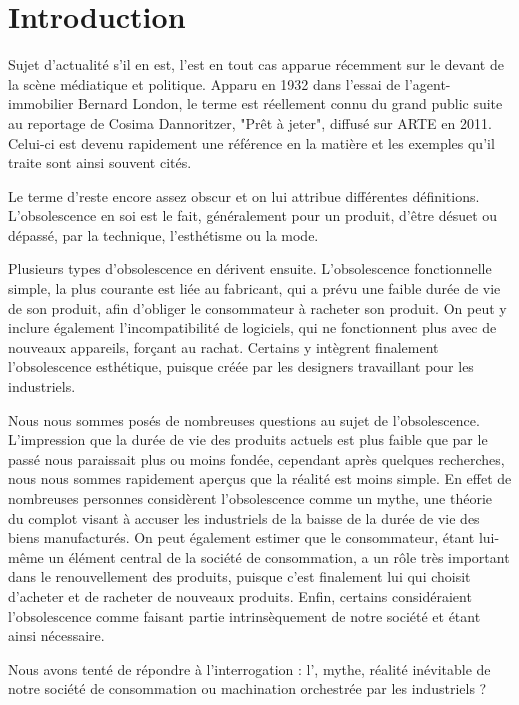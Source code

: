 \chapter*{Introduction}



Sujet d'actualité s'il en est, l'\op est en tout cas apparue récemment sur le devant de la scène médiatique et politique. Apparu en 1932 dans l'essai de l'agent-immobilier Bernard London, le terme est réellement connu du grand public suite au reportage de Cosima Dannoritzer, "Prêt à jeter", diffusé sur ARTE en 2011. Celui-ci est devenu rapidement une référence en la matière et les exemples qu'il traite sont ainsi souvent cités.

\smallbreak Le terme d'\op reste encore assez obscur et on lui attribue différentes définitions. L'obsolescence en soi est le fait, généralement pour un produit, d'être désuet ou dépassé, par la technique, l'esthétisme ou la mode.

\smallbreak Plusieurs types d'obsolescence en dérivent ensuite. L’obsolescence fonctionnelle simple, la plus courante est liée au fabricant, qui a prévu une faible durée de vie de son produit, afin d'obliger le consommateur à racheter son produit. On peut y inclure également l'incompatibilité de logiciels, qui ne fonctionnent plus avec de nouveaux appareils, forçant au rachat. Certains y intègrent finalement l'obsolescence esthétique, puisque créée par les designers travaillant pour les industriels.

\smallbreak Nous nous sommes posés de nombreuses questions au sujet de l'obsolescence. L'impression que la durée de vie des produits actuels est plus faible que par le passé nous paraissait plus ou moins fondée, cependant après quelques recherches, nous nous sommes rapidement aperçus que la réalité est moins simple. En effet de nombreuses personnes considèrent l'obsolescence comme un mythe, une théorie du complot visant à accuser les industriels de la baisse de la durée de vie des biens manufacturés. On peut également estimer que le consommateur, étant lui-même un élément central de la société de consommation, a un rôle très important dans le renouvellement des produits, puisque c'est finalement lui qui choisit d'acheter et de racheter de nouveaux produits. Enfin, certains considéraient l'obsolescence comme faisant partie intrinsèquement de notre société et étant ainsi nécessaire.

\bigbreak Nous avons tenté de répondre à l'interrogation : l'\op, mythe, réalité inévitable de notre société de consommation ou machination orchestrée par les industriels ?

